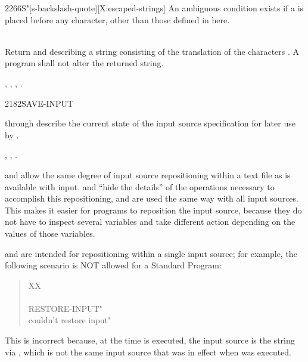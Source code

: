 \begin{worddef}[Seq]{2266}{S\bs"}[s-backslash-quote][X:escaped-strings]
	An ambiguous condition exists if a \bs{} is placed before any character,
	other than those defined in here.

\runtime {} \\
	Return  and  describing a string consisting of
	the translation of the characters .  A program shall not
	alter the returned string.

\see {},
	,
	,
	.
\end{worddef}


\begin{worddef}{2182}{SAVE-INPUT}
\item {}

	 through  describe the current state of the
	input source specification for later use by .

\see {}, ,
	  .

	\begin{rationale} %
		 and  allow the same
		degree of input source repositioning within a text file as is
		available with  input. 
		and  ``hide the details'' of the operations
		necessary to accomplish this repositioning, and are used the
		same way with all input sources. This makes it easier for
		programs to reposition the input source, because they do not
		have to inspect several variables and take different action
		depending on the values of those variables.

		 and  are intended for
		repositioning within a single input source; for example, the
		following scenario is NOT allowed for a Standard Program:

		\begin{quote}\ttfamily
			\word{:} XX \\
			\tab {} ~  \\
			\tab {} RESTORE-INPUT"  \\
			\tab {} couldn't restore input" \\
			\word{;}
		\end{quote}

		This is incorrect because, at the time  is
		executed, the input source is the string via ,
		which is not the same input source that was in effect when
		 was executed.


\end{rationale}
\end{worddef}
